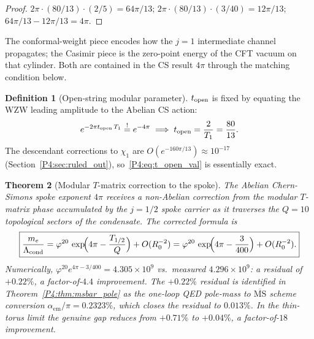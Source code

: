 \documentclass[11pt,a4paper]{article}
\newtheorem{theorem}{Theorem}[section]
\theoremstyle{definition}
\newtheorem{definition}[theorem]{Definition}
\theoremstyle{remark}
\newcommand{\vp}{\varphi}
\newcommand{\aem}{\alpha_{\mathrm{em}}}
\newcommand{\Lcond}{\Lambda_{\mathrm{cond}}}
\begin{document}
\begin{proof}
$2\pi\cdot(80/13)\cdot(2/5) = 64\pi/13$;\quad
$2\pi\cdot(80/13)\cdot(3/40) = 12\pi/13$;\quad
$64\pi/13 - 12\pi/13 = 4\pi$.
\end{proof}

The conformal-weight piece encodes how the $j=1$ intermediate channel
propagates; the Casimir piece is the zero-point energy of the CFT vacuum
on that cylinder.  Both are contained in the CS result $4\pi$ through
the matching condition below.

\begin{definition}[Open-string modular parameter]
\label{P4:def:t_open}
$t_{\rm open}$ is fixed by equating the WZW leading amplitude to the
Abelian CS action:
\begin{equation}
  e^{-2\pi t_{\rm open}\,T_1} \stackrel{!}{=} e^{-4\pi}
  \;\Longrightarrow\;
  t_{\rm open} = \frac{2}{T_1} = \frac{80}{13}.
  \label{P4:eq:t_open_val}
\end{equation}
The descendant corrections to $\chi_1$ are $O(e^{-160\pi/13})\approx10^{-17}$
(Section~\ref{P4:sec:ruled_out}), so~\eqref{P4:eq:t_open_val} is essentially exact.
\end{definition}

\begin{theorem}[Modular $T$-matrix correction to the spoke]
\label{P4:thm:t_matrix_spoke}
The Abelian Chern-Simons spoke exponent $4\pi$ receives a non-Abelian
correction from the modular $T$-matrix phase accumulated by the $j=1/2$
spoke carrier as it traverses the $Q=10$ topological sectors of the
condensate.  The corrected formula is
\begin{equation}
  \boxed{
  \frac{m_e}{\Lcond}
  = \vp^{20}\,\exp\!\Bigl(4\pi - \frac{T_{1/2}}{Q}\Bigr)
    + O(R_0^{-2})
  = \vp^{20}\,\exp\!\Bigl(4\pi - \frac{3}{400}\Bigr)
    + O(R_0^{-2}).
  }
  \label{P4:eq:spoke_corrected}
\end{equation}
Numerically, $\vp^{20}e^{4\pi-3/400} = 4.305\times10^9$ vs.\ measured
$4.296\times10^9$: a residual of $+0.22\%$, a factor-of-$4.4$ improvement.
The $+0.22\%$ residual is identified in Theorem~\ref{P4:thm:msbar_pole}
as the one-loop QED pole-mass to $\overline{\mathrm{MS}}$ scheme conversion
$\aem/\pi = 0.2323\%$, which closes the residual to $0.013\%$.
In the thin-torus limit the genuine gap reduces from $+0.71\%$ to $+0.04\%$,
a factor-of-$18$ improvement.
\end{theorem}
\end{document}
